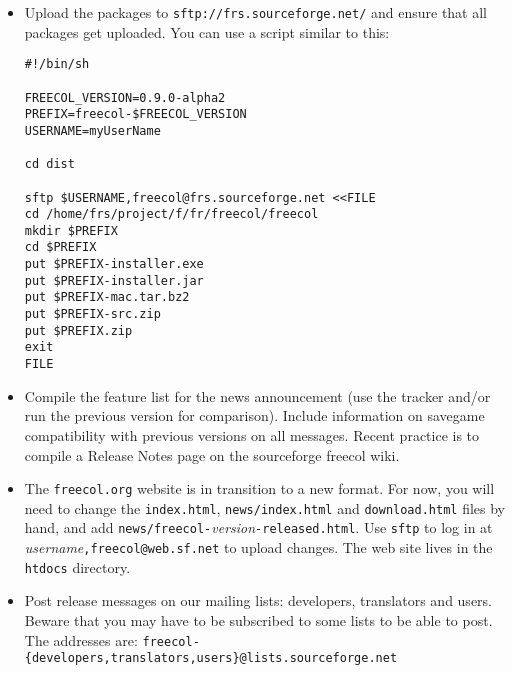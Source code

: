 \documentclass[12pt]{book}
\begin{document}
\begin{itemize}
\item Upload the packages to \verb+sftp://frs.sourceforge.net/+ and ensure that
  all packages get uploaded. You can use a script similar to this:

\begin{verbatim}
#!/bin/sh

FREECOL_VERSION=0.9.0-alpha2
PREFIX=freecol-$FREECOL_VERSION
USERNAME=myUserName

cd dist

sftp $USERNAME,freecol@frs.sourceforge.net <<FILE
cd /home/frs/project/f/fr/freecol/freecol
mkdir $PREFIX
cd $PREFIX
put $PREFIX-installer.exe
put $PREFIX-installer.jar
put $PREFIX-mac.tar.bz2
put $PREFIX-src.zip
put $PREFIX.zip
exit
FILE
\end{verbatim}

\item Compile the feature list for the news announcement (use the
  tracker and/or run the previous version for comparison).  Include
  information on savegame compatibility with previous versions on all
  messages.  Recent practice is to compile a Release Notes page on the
  sourceforge freecol wiki.

\item The \texttt{freecol.org} website is in transition to a new
  format.  For now, you will need to change the \texttt{index.html},
  \texttt{news/index.html} and \texttt{download.html} files by hand,
  and add \texttt{news/freecol-}\emph{version}\texttt{-released.html}.
  Use \texttt{sftp} to log in at \emph{username}\texttt{,freecol@web.sf.net}
  to upload changes.  The web site lives in the \texttt{htdocs} directory.

%
%
%

\item Post release messages on our mailing lists: developers,
  translators and users.  Beware that you may have to be subscribed to
  some lists to be able to post.  The addresses are:
  \texttt{freecol-\{developers,translators,users\}@lists.sourceforge.net}


\end{itemize}
\end{document}
